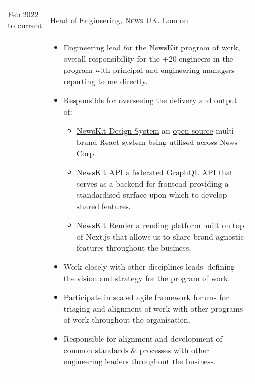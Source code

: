 \documentclass[a4paper,10pt]{article} %
\begin{document}
\begin{tabular}{ L{2cm} | L{11cm}}	
	 \\
	Feb 2022 to current & Head of Engineering, \textsc{News UK}, London \\
	&\MPtrue
	\begin{itemize}[leftmargin=*]
			\item Engineering lead for the NewsKit program of work, overall responsibility for the +20 engineers in the program with principal and engineering managers reporting to me directly. 	
			\item Responsible for overseeing the delivery and output of:
				\begin{itemize}
					\item \href{https://newskit.co.uk}{NewsKit Design System} an \href{https://github.com/newscorp-ghfb/newskit/}{open-source} multi-brand React system being utilised across News Corp.
					\item NewsKit API a federated GraphQL API that serves as a backend for frontend providing a standardised surface upon which to develop shared features.
					\item NewsKit Render a rending platform built on top of Next.js that allows us to share brand agnostic features throughout the business.
				\end{itemize}
			\item Work closely with other disciplines leads, defining the vision and strategy for the program of work.
			\item Participate in scaled agile framework forums for triaging and alignment of work with other programs of work throughout the organisation. 			
			\item Responsible for alignment and development of common standards \& processes with other engineering leaders throughout the business. 				
		\end{itemize} \\ 
	 \\

\end{tabular}
\clearpage
\end{document}
